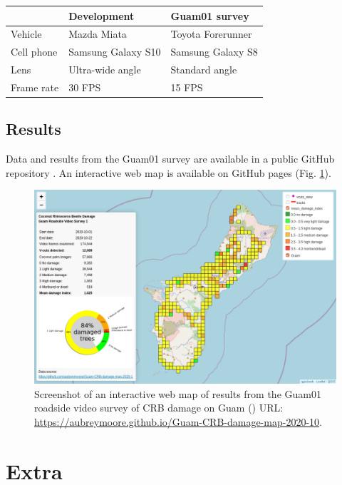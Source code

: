 \documentclass[12pt,letterpaper,english,bibliography=totocnumbered, abstract=on]{scrartcl}
\begin{document}
\begin{tabular}{|l|l|l|}
	\hline 
	& \textbf{Development} & \textbf{Guam01 survey} \\ 
	\hline 
	Vehicle & Mazda Miata & Toyota Forerunner \\ 
	\hline 
	Cell phone & Samsung Galaxy S10 & Samsung Galaxy S8 \\ 
    \hline 
	Lens & Ultra-wide angle & Standard angle \\
	\hline
	Frame rate & 30 FPS & 15 FPS \\
\hline
\end{tabular} 

\subsection{Results}

Data and results from the Guam01 survey are available in a public GitHub repository \cite{mooreGitHubRepositoryGuamCRBdamagemap2020102020}. An interactive web map is available on GitHub pages (Fig. \ref{fig:guam01webmap}).

\begin{figure}[H]
	\centering
	\includegraphics[width=\linewidth]{images/Guam01-webmap}
	\caption{Screenshot of an interactive web map of results from the Guam01 roadside video survey of CRB damage on Guam (\cite{mooreWebMapGuamCRBdamagemap2020102020}) URL: \url{https://aubreymoore.github.io/Guam-CRB-damage-map-2020-10}.}
	\label{fig:guam01webmap}
\end{figure}


\section{Extra}
\end{document}

